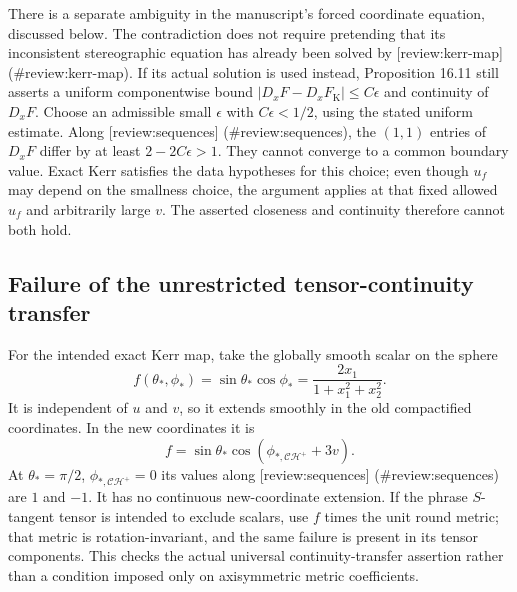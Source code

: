 \documentclass[10pt]{article}
\begin{document}
There is a separate ambiguity in the manuscript’s forced coordinate equation, discussed below. The contradiction does not require pretending that its inconsistent stereographic equation has already been solved by [review:kerr-map] (\#review:kerr-map). If its actual solution is used instead, Proposition 16.11 still asserts a uniform componentwise bound \(|D_xF-D_xF_{\mathrm K}|\leq C\epsilon\) and continuity of \(D_xF\). Choose an admissible small \(\epsilon\) with \(C\epsilon<1/2\), using the stated uniform estimate. Along [review:sequences] (\#review:sequences), the \((1,1)\) entries of \(D_xF\) differ by at least \(2-2C\epsilon>1\). They cannot converge to a common boundary value. Exact Kerr satisfies the data hypotheses for this choice; even though \(u_f\) may depend on the smallness choice, the argument applies at that fixed allowed \(u_f\) and arbitrarily large \(v\). The asserted closeness and continuity therefore cannot both hold.\par
\subsection*{Failure of the unrestricted tensor-continuity transfer}
For the intended exact Kerr map, take the globally smooth scalar on the sphere \[f(\theta_*,\phi_*)=\sin\theta_*\cos\phi_*
                 =\frac{2x_1}{1+x_1^2+x_2^2}.\] It is independent of \(u\) and \(v\), so it extends smoothly in the old compactified coordinates. In the new coordinates it is \[f=\sin\theta_*\cos(\phi_{*,\mathcal{CH}^{+}}+3v).\] At \(\theta_*=\pi/2\), \(\phi_{*,\mathcal{CH}^{+}}=0\) its values along [review:sequences] (\#review:sequences) are \(1\) and \(-1\). It has no continuous new-coordinate extension. If the phrase \(S\)-tangent tensor is intended to exclude scalars, use \(f\) times the unit round metric; that metric is rotation-invariant, and the same failure is present in its tensor components. This checks the actual universal continuity-transfer assertion rather than a condition imposed only on axisymmetric metric coefficients.\par
\end{document}
